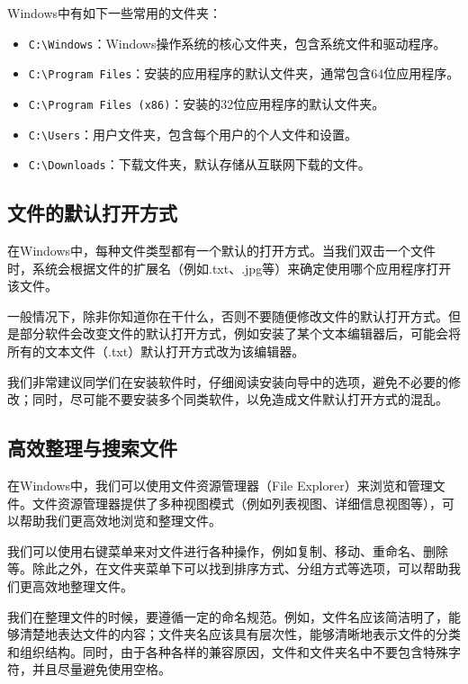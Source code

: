 \documentclass[../main.tex]{subfiles}
\begin{document}
Windows中有如下一些常用的文件夹：
\begin{itemize}
  \item \texttt{C:\textbackslash Windows}：Windows操作系统的核心文件夹，包含系统文件和驱动程序。
  \item \texttt{C:\textbackslash Program Files}：安装的应用程序的默认文件夹，通常包含64位应用程序。
  \item \texttt{C:\textbackslash Program Files (x86)}：安装的32位应用程序的默认文件夹。
  \item \texttt{C:\textbackslash Users}：用户文件夹，包含每个用户的个人文件和设置。
  \item \texttt{C:\textbackslash Downloads}：下载文件夹，默认存储从互联网下载的文件。
\end{itemize}

\subsection{文件的默认打开方式}

在Windows中，每种文件类型都有一个默认的打开方式。当我们双击一个文件时，系统会根据文件的扩展名（例如.txt、.jpg等）来确定使用哪个应用程序打开该文件。

一般情况下，除非你知道你在干什么，否则不要随便修改文件的默认打开方式。但是部分软件会改变文件的默认打开方式，例如安装了某个文本编辑器后，可能会将所有的文本文件（.txt）默认打开方式改为该编辑器。

我们非常建议同学们在安装软件时，仔细阅读安装向导中的选项，避免不必要的修改；同时，尽可能不要安装多个同类软件，以免造成文件默认打开方式的混乱。

\subsection{高效整理与搜索文件}

在Windows中，我们可以使用文件资源管理器（File Explorer）来浏览和管理文件。文件资源管理器提供了多种视图模式（例如列表视图、详细信息视图等），可以帮助我们更高效地浏览和整理文件。

我们可以使用右键菜单来对文件进行各种操作，例如复制、移动、重命名、删除等。除此之外，在文件夹菜单下可以找到排序方式、分组方式等选项，可以帮助我们更高效地整理文件。

我们在整理文件的时候，要遵循一定的命名规范。例如，文件名应该简洁明了，能够清楚地表达文件的内容；文件夹名应该具有层次性，能够清晰地表示文件的分类和组织结构。同时，由于各种各样的兼容原因，文件和文件夹名中不要包含特殊字符，并且尽量避免使用空格。
\end{document}
